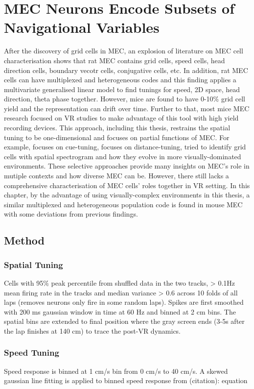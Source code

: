 \chapter{MEC Neurons Encode Subsets of Navigational Variables}
\label{chapterlabel5}
After the discovery of grid cells in MEC, an explosion of literature on MEC cell characterisation shows that rat MEC contains grid cells, speed cells, head direction cells, boundary vecotr cells, conjugative cells, etc. In addition, rat MEC cells can have multiplexed and heterogeneous codes and this finding applies a multivariate generalised linear model to find tunings for speed, 2D space, head direction, theta phase together. However, mice are found to have 0-10\% grid cell yield and the representation can drift over time. Further to that, most mice MEC research focused on VR studies to make advantage of this tool with high yield recording devices. This approach, including this thesis, restrains the spatial tuning to be one-dimensional and focuses on partial functions of MEC. For example, focuses on cue-tuning, focuses on distance-tuning, tried to identify grid cells with spatial spectrogram and how they evolve in more visually-dominated environments. These selective approaches provide many insights on MEC's role in mutiple contexts and how diverse MEC can be. However, there still lacks a comprehensive characterisation of MEC cells' roles together in VR setting. In this chapter, by the advantage of using visually-complex environments in this thesis, a similar multiplexed and heterogeneous population code is found in mouse MEC with some deviations from previous findings. 

\section{Method}
\subsection{Spatial Tuning}
Cells with 95\% peak percentile from shuffled data in the two tracks, > 0.1Hz mean firing rate in the tracks and median variance > 0.6 across 10 folds of all laps (removes neurons only fire in some random laps). Spikes are first smoothed with 200 ms gaussian window in time at 60 Hz and binned at 2 cm bins. The spatial bins are extended to final position where the gray screen ends (3-5s after the lap finishes at 140 cm) to trace the post-VR dynamics.

\subsection{Speed Tuning}
Speed response is binned at 1 cm/s bin from 0 cm/s to 40 cm/s. A skewed gaussian line fitting is applied to binned speed response from (citation):
equation

